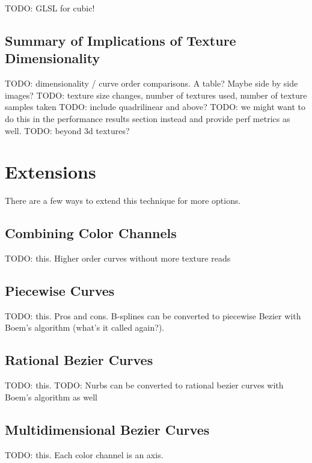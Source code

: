 \documentclass{jcgt}
\begin{document}
TODO: GLSL for cubic!

\subsection{Summary of Implications of Texture Dimensionality}

TODO: dimensionality / curve order comparisons. A table? Maybe side by side images?
TODO: texture size changes, number of textures used, number of texture samples taken
TODO: include quadrilinear and above?
TODO: we might want to do this in the performance results section instead and provide perf metrics as well.
TODO: beyond 3d textures?

\section{Extensions}
\label{sec:extensions}

There are a few ways to extend this technique for more options.

\subsection{Combining Color Channels}

TODO: this.  Higher order curves without more texture reads

\subsection{Piecewise Curves}

TODO: this.  Pros and cons. B-splines can be converted to piecewise Bezier with Boem's algorithm (what's it called again?).

\subsection{Rational Bezier Curves}

TODO: this.
TODO: Nurbs can be converted to rational bezier curves with Boem's algorithm as well

\subsection{Multidimensional Bezier Curves}

TODO: this.  Each color channel is an axis.

\end{document}

